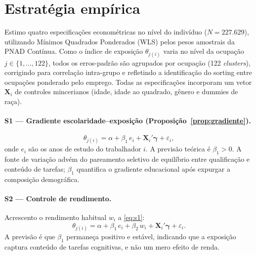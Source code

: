 \section{Estratégia empírica}
\label{sec:estrategia}

Estimo quatro especificações econométricas no nível do indivíduo ($N = 227.629$), utilizando Mínimos Quadrados Ponderados (WLS) pelos pesos amostrais da PNAD Contínua. Como o índice de exposição $\theta_{j(i)}$ varia no nível da ocupação $j \in \{1, \dots, 122\}$, todos os erros-padrão são agrupados por ocupação (122 \emph{clusters}), corrigindo para correlação intra-grupo e refletindo a identificação do sorting entre ocupações ponderado pelo emprego. Todas as especificações incorporam um vetor $\mathbf{X}_i$ de controles mincerianos (idade, idade ao quadrado, gênero e dummies de raça).

\paragraph{S1 --- Gradiente escolaridade--exposição (Proposição~\ref{prop:gradiente}).}
\begin{equation}
    \theta_{j(i)} = \alpha + \beta_1 \, e_i + \mathbf{X}_i' \boldsymbol{\gamma} + \varepsilon_i,
    \label{eq:s1}
\end{equation}
onde $e_i$ são os anos de estudo do trabalhador $i$. A previsão teórica é $\beta_1 > 0$. A fonte de variação advém do pareamento seletivo de equilíbrio entre qualificação e conteúdo de tarefas; $\beta_1$ quantifica o gradiente educacional após expurgar a composição demográfica.

\paragraph{S2 --- Controle de rendimento.}
Acrescento o rendimento habitual $w_i$ a \eqref{eq:s1}:
\begin{equation}
    \theta_{j(i)} = \alpha + \beta_1 \, e_i + \beta_2 \, w_i + \mathbf{X}_i' \boldsymbol{\gamma} + \varepsilon_i.
    \label{eq:s2}
\end{equation}
A previsão é que $\beta_1$ permaneça positivo e estável, indicando que a exposição captura conteúdo de tarefas cognitivas, e não um mero efeito de renda.

